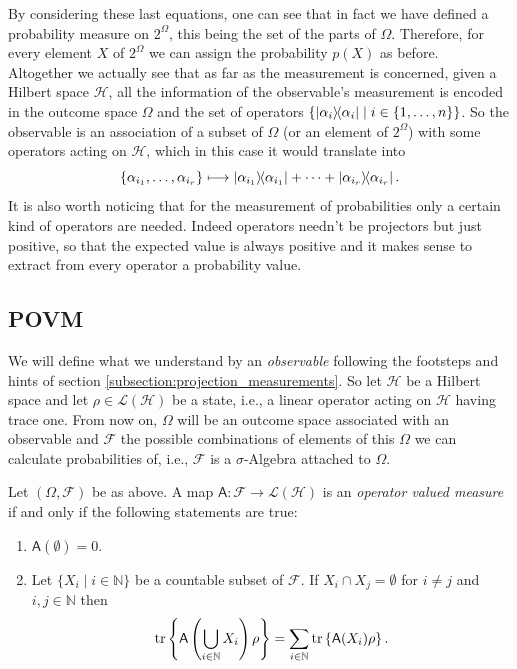 \documentclass[10pt, a4paper]{amsart}
\begin{document}
By considering these last equations, one can see that in fact we have defined a probability measure 
on $2^{\Omega}$, this being the set of the parts of $\Omega$. Therefore, for every element $X$ of $2^{\Omega}$ we can assign the probability $p(X)$ as before. \\

Altogether we actually see  that as far as the measurement is concerned, given a Hilbert space $\mathcal{H}$, all the information of the observable's measurement is encoded in the outcome space $\Omega$ and the set of operators $\left \{\left| \alpha_{i}\right\rangle\!\!\left\langle \alpha_{i}\right|\mid i\in \{1,\ldots , n\}\right \}$.
So the observable is an association of a subset of $\Omega$ (or an element of $2^{\Omega}$) with some operators acting on $\mathcal{H}$, which in this case it would translate into
\[
\{\alpha_{i_{1}}, \ldots, \alpha_{i_{r}}\}\longmapsto \left| \alpha_{i_{1}}\right\rangle\!\!\left\langle \alpha_{i_{1}}\right|+\cdots + \left| \alpha_{i_{r}}\right\rangle\!\!\left\langle \alpha_{i_{r}}\right|.
\]
It is also worth noticing that for the measurement of probabilities only a certain kind of operators are needed. Indeed operators needn't be projectors but just positive, so that the expected value is always positive and it makes sense to extract from every operator a probability value. 



\subsection{POVM}
We will define what we understand by an \textit{observable} following the footsteps and hints of section \ref{subsection:projection_measurements}.
So let $\mathcal{H}$ be a Hilbert space and let $\rho \in \mathcal{L}(\mathcal{H})$ be a state, i.e., a linear operator acting on $\mathcal{H}$ having trace one. From now on, $\Omega$ will be an outcome space associated with an observable and $\mathcal{F}$ the possible combinations of elements of this $\Omega$ we can calculate probabilities of, i.e., $\mathcal{F}$ is a $\sigma$-Algebra attached to $\Omega$. 


\begin{definition}
\label{def:operator_valued_measure}
Let $(\Omega, \mathcal{F})$ be as above. A map $\mathsf{A}: \mathcal{F}\to \mathcal{L}(\mathcal{H})$ is an \textit{operator valued measure} if and only if the following statements are true:
    \begin{enumerate}
        \item $\mathsf{A}(\emptyset) = 0 $.
        \item Let $\{X_{i}\mid i\in \mathbb{N}\}$ be a countable subset of $\mathcal{F}$. If $X_{i}\cap X_{j} = \emptyset$ for $i\neq j$ and $i,j\in\mathbb{N}$ then 
        \[
 \mathrm{tr}\left \{ 
 \mathsf{A}\left (
 \bigcup_{i\in\mathbb{N}} X_{i}
 \right )
  \rho
 \right \}
 =
  \sum_{i\in\mathbb{N}}\mathrm{tr}\left \{
\mathsf{A}(X_{i})\rho  
  \right \}        . 
        \]
    \end{enumerate}
\end{definition}
\end{document}
